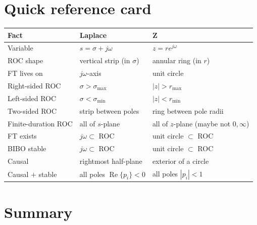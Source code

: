 \documentclass[11pt]{article}
\begin{document}
\section{Quick reference card}

\begin{center}
\begin{tabular}{@{}l l l@{}}
\toprule
Fact & Laplace & Z \\
\midrule
Variable & $s = \sigma + j\omega$ & $z = re^{j\omega}$ \\
ROC shape & vertical strip (in $\sigma$) & annular ring (in $r$) \\
FT lives on & $j\omega$-axis & unit circle \\
Right-sided ROC & $\sigma > \sigma_{\max}$ & $|z| > r_{\max}$ \\
Left-sided ROC & $\sigma < \sigma_{\min}$ & $|z| < r_{\min}$ \\
Two-sided ROC & strip between poles & ring between pole radii \\
Finite-duration ROC & all of $s$-plane & all of $z$-plane (maybe not $0, \infty$) \\
FT exists & $j\omega \subset$ ROC & unit circle $\subset$ ROC \\
BIBO stable & $j\omega \subset$ ROC & unit circle $\subset$ ROC \\
Causal & rightmost half-plane & exterior of a circle \\
Causal $+$ stable & all poles $\operatorname{Re}\{p_i\} < 0$ & all poles $|p_i| < 1$ \\
\bottomrule
\end{tabular}
\end{center}

\section{Summary}
\end{document}

